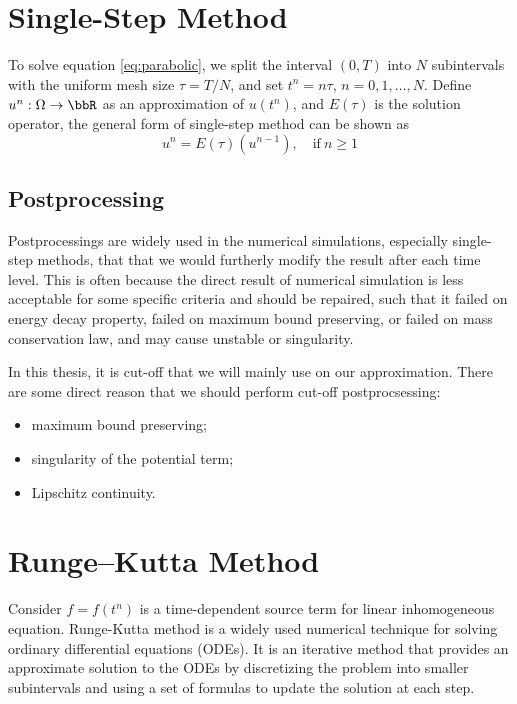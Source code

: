 \section{Single-Step Method}

To solve equation \eqref{eq:parabolic}, 
we split the interval $(0,T)$ into $N$ subintervals with the uniform mesh size $\tau=T/N$,
and set $t^n = n\tau$, $n=0,1,\ldots,N$. 
Define $u^n: \Omega \to \bbR$ as an approximation of $u(t^n)$, 
and $E(\tau)$ is the solution operator,
the general form of single-step method can be shown as 
\begin{equation}\label{eq:single-step}
    u^n = E(\tau) (u^{n-1}), \quad \text{if}~n \geq 1
\end{equation}
\subsection{Postprocessing}

Postprocessings are widely used in the numerical simulations, especially single-step methods, 
that that we would furtherly modify the result after each time level. 
This is often because the direct result of numerical simulation 
is less acceptable for some specific criteria and should be repaired, 
such that it failed on energy decay property, failed on maximum bound preserving, 
or failed on mass conservation law, and may cause unstable or singularity. 

In this thesis, it is cut-off that we will mainly use on our approximation. 
There are some direct reason that we should perform cut-off postprocsessing:
\begin{itemize}
    \item[1.] maximum bound preserving; 
    \item[2.] singularity of the potential term; 
    \item[3.] Lipschitz continuity. 
\end{itemize}





\section{Runge--Kutta Method}

Consider $f = f(t^n)$ is a time-dependent source term for linear inhomogeneous equation. 
Runge-Kutta method is a widely used numerical technique for solving ordinary differential equations (ODEs). It is an iterative method that provides an approximate solution to the ODEs by discretizing the problem into smaller subintervals and using a set of formulas to update the solution at each step.

